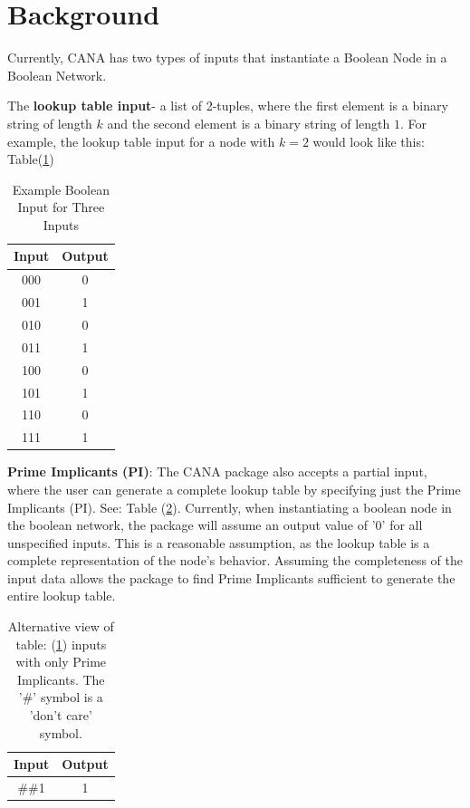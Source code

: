 \documentclass[letterpaper]{article}
\begin{document}
\section{Background}
Currently, CANA has two types of inputs that instantiate a Boolean Node in a Boolean Network.

The \textbf{lookup table input}- a list of 2-tuples, where the first element is a binary string of length $k$ and the second element is a binary string of length $1$. 
For example, the lookup table input for a node with $k=2$ would look like this: Table(\ref{table:boolean-input})

    \begin{table}
        \centering
        \begin{tabular}{|c|c|}
            \hline
            Input & Output \\
            \hline
            000 & 0 \\
            001 & 1 \\
            010 & 0 \\
            011 & 1 \\
            100 & 0 \\
            101 & 1 \\
            110 & 0 \\
            111 & 1 \\
            \hline
        \end{tabular}
        \caption{Example Boolean Input for Three Inputs}
        \label{table:boolean-input}
    \end{table}
\textbf{Prime Implicants (PI)}: The CANA package also accepts a partial input, where the user can generate a complete lookup table by specifying just the Prime Implicants (PI). See: Table (\ref{table:boolean-input-PI}). 
Currently, when instantiating a boolean node in the boolean network, the package will assume an output value of '0' for all unspecified inputs. 
This is a reasonable assumption, as the lookup table is a complete representation of the node's behavior. 
Assuming the completeness of the input data allows the package to find Prime Implicants sufficient to generate the entire lookup table.
    \begin{table}
        \centering
        \begin{tabular}{|c|c|}
            \hline
            Input & Output \\
            \hline
            \#\#1 & 1 \\
            \hline
        \end{tabular}
        \caption{Alternative view of table: (\ref{table:boolean-input}) inputs with only Prime Implicants. The '\#' symbol is a 'don't care' symbol.}
        \label{table:boolean-input-PI}
    \end{table}
\end{document}
